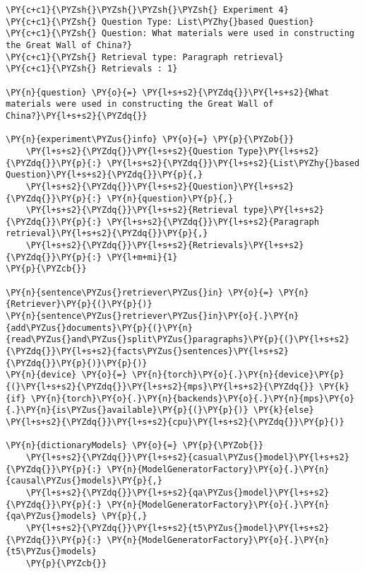 \documentclass[11pt]{wseas}
\begin{document}
    \begin{tcolorbox}[breakable, size=fbox, boxrule=1pt, pad at break*=1mm,colback=cellbackground, colframe=cellborder]
\begin{Verbatim}[commandchars=\\\{\}]
\PY{c+c1}{\PYZsh{}\PYZsh{}\PYZsh{}\PYZsh{} Experiment 4}
\PY{c+c1}{\PYZsh{} Question Type: List\PYZhy{}based Question}
\PY{c+c1}{\PYZsh{} Question: What materials were used in constructing the Great Wall of China?}
\PY{c+c1}{\PYZsh{} Retrieval type: Paragraph retrieval}
\PY{c+c1}{\PYZsh{} Retrievals : 1}

\PY{n}{question} \PY{o}{=} \PY{l+s+s2}{\PYZdq{}}\PY{l+s+s2}{What materials were used in constructing the Great Wall of China?}\PY{l+s+s2}{\PYZdq{}}

\PY{n}{experiment\PYZus{}info} \PY{o}{=} \PY{p}{\PYZob{}}
    \PY{l+s+s2}{\PYZdq{}}\PY{l+s+s2}{Question Type}\PY{l+s+s2}{\PYZdq{}}\PY{p}{:} \PY{l+s+s2}{\PYZdq{}}\PY{l+s+s2}{List\PYZhy{}based Question}\PY{l+s+s2}{\PYZdq{}}\PY{p}{,}
    \PY{l+s+s2}{\PYZdq{}}\PY{l+s+s2}{Question}\PY{l+s+s2}{\PYZdq{}}\PY{p}{:} \PY{n}{question}\PY{p}{,}
    \PY{l+s+s2}{\PYZdq{}}\PY{l+s+s2}{Retrieval type}\PY{l+s+s2}{\PYZdq{}}\PY{p}{:} \PY{l+s+s2}{\PYZdq{}}\PY{l+s+s2}{Paragraph retrieval}\PY{l+s+s2}{\PYZdq{}}\PY{p}{,}
    \PY{l+s+s2}{\PYZdq{}}\PY{l+s+s2}{Retrievals}\PY{l+s+s2}{\PYZdq{}}\PY{p}{:} \PY{l+m+mi}{1}
\PY{p}{\PYZcb{}}

\PY{n}{sentence\PYZus{}retriever\PYZus{}in} \PY{o}{=} \PY{n}{Retriever}\PY{p}{(}\PY{p}{)}
\PY{n}{sentence\PYZus{}retriever\PYZus{}in}\PY{o}{.}\PY{n}{add\PYZus{}documents}\PY{p}{(}\PY{n}{read\PYZus{}and\PYZus{}split\PYZus{}paragraphs}\PY{p}{(}\PY{l+s+s2}{\PYZdq{}}\PY{l+s+s2}{facts\PYZus{}sentences}\PY{l+s+s2}{\PYZdq{}}\PY{p}{)}\PY{p}{)}
\PY{n}{device} \PY{o}{=} \PY{n}{torch}\PY{o}{.}\PY{n}{device}\PY{p}{(}\PY{l+s+s2}{\PYZdq{}}\PY{l+s+s2}{mps}\PY{l+s+s2}{\PYZdq{}} \PY{k}{if} \PY{n}{torch}\PY{o}{.}\PY{n}{backends}\PY{o}{.}\PY{n}{mps}\PY{o}{.}\PY{n}{is\PYZus{}available}\PY{p}{(}\PY{p}{)} \PY{k}{else} \PY{l+s+s2}{\PYZdq{}}\PY{l+s+s2}{cpu}\PY{l+s+s2}{\PYZdq{}}\PY{p}{)}

\PY{n}{dictionaryModels} \PY{o}{=} \PY{p}{\PYZob{}}
    \PY{l+s+s2}{\PYZdq{}}\PY{l+s+s2}{casual\PYZus{}model}\PY{l+s+s2}{\PYZdq{}}\PY{p}{:} \PY{n}{ModelGeneratorFactory}\PY{o}{.}\PY{n}{causal\PYZus{}models}\PY{p}{,} 
    \PY{l+s+s2}{\PYZdq{}}\PY{l+s+s2}{qa\PYZus{}model}\PY{l+s+s2}{\PYZdq{}}\PY{p}{:} \PY{n}{ModelGeneratorFactory}\PY{o}{.}\PY{n}{qa\PYZus{}models} \PY{p}{,}
    \PY{l+s+s2}{\PYZdq{}}\PY{l+s+s2}{t5\PYZus{}model}\PY{l+s+s2}{\PYZdq{}}\PY{p}{:} \PY{n}{ModelGeneratorFactory}\PY{o}{.}\PY{n}{t5\PYZus{}models} 
    \PY{p}{\PYZcb{}}


\end{Verbatim}
\end{tcolorbox}
\end{document}
